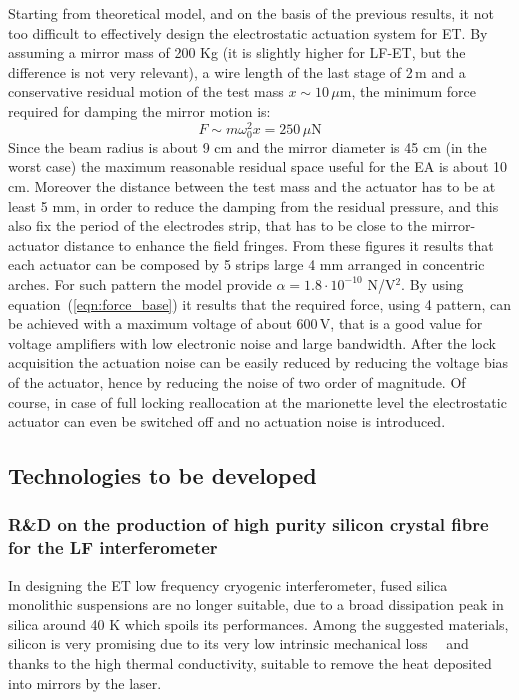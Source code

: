 Starting from theoretical model, and on the basis of the previous results, it not too difficult to effectively design the electrostatic actuation system for ET. By assuming a mirror mass of 200 Kg (it is slightly higher for LF-ET, but the difference is not very relevant), a wire length of the last stage of 2\,m and a conservative residual motion of the test mass  $x \sim10 \, \mu$m, the minimum force required for damping the mirror motion is:
\begin{equation}
F \sim m\omega_0^2 x = 250 \, \mu\textrm{N}
\end{equation}
Since the beam radius is about 9 cm and the mirror diameter is 45 cm (in the worst case) the maximum reasonable residual space useful for the EA is about 10 cm. Moreover the distance between the test mass and the actuator has to be at least 5 mm, in order to reduce the damping from the residual pressure, and this also fix the period of the electrodes strip, that has to be close to the mirror-actuator distance to enhance the field fringes.
From these figures it results that each actuator can be composed by 5 strips large 4 mm arranged in concentric arches. For such pattern the model provide $\alpha=1.8\cdot10^{-10}$ N/V$^2$. By using equation~(\ref{eqn:force_base}) it results that the required force, using 4 pattern, can be achieved with a maximum voltage of about 600\,V, that is a good value for voltage amplifiers with low electronic noise and large bandwidth.
After the lock acquisition the actuation noise can be easily reduced by reducing the voltage bias of the actuator, hence by reducing the noise of two order of magnitude. Of course, in case of full locking reallocation at the marionette level the electrostatic actuator can even be switched off and no actuation noise is introduced.


\FloatBarrier
\subsection{Technologies to be developed}
\label{sec:technologies}


\FloatBarrier
\subsubsection{R\&D on the production of high purity silicon crystal fibre for the LF interferometer}
\label{sec:crystal-production} 

In designing the ET low frequency
    cryogenic interferometer, fused silica  monolithic suspensions are no longer
    suitable, due to a broad dissipation peak in silica around 40 K which spoils its performances. Among the suggested materials,
    silicon is very promising due to its very low intrinsic
    mechanical loss~\cite{lam}~\cite{McGuigan1978} and thanks to
    the high thermal conductivity, suitable to remove the heat
    deposited into mirrors by the laser.

